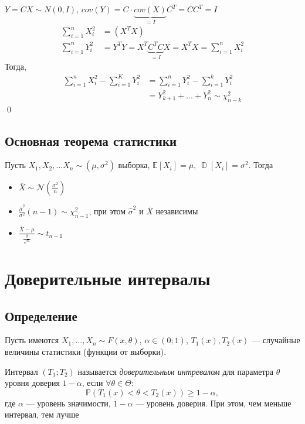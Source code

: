 \documentclass[a4paper, 10pt]{article}
\begin{document}
\proof $Y=C X \sim N(0, I)$, $cov(Y)=C\cdot \underbrace{cov(X)}_{=I}C^T=CC^T=I$
\begin{equation*}
    \begin{aligned}
        \sum_{i=1}^{n} X_{i}^{2}&=\left(X^{T} X\right)\\
        \sum_{i=1}^{n} Y_{i}^{2}&=Y^TY=X^T\underbrace{C^TC}_{=I}X=X^TX=\sum_{i=1}^{n} X_{i}^{2}
    \end{aligned}
\end{equation*}
Тогда,
\begin{equation*}
    \begin{aligned}
        \sum_{i=1}^{n} X_{i}^{2}-\sum_{i=1}^{K} Y_{i}^{2}&=\sum_{i=1}^{n} Y_{i}^{2}-\sum_{i=1}^{k} Y_{i}^{2}\\
        &=Y^2_{k+1}+\ldots+Y^2_{n}\sim\chi^2_{n-k}
    \end{aligned}
\end{equation*}\qed

\subsection{Основная теорема статистики}
\theorem Пусть $X_{1}, X_{2}, \ldots X_{n} \sim\left(\mu, \sigma^{2}\right)$ выборка, $\mathbb{E}\left[X_{i}\right]=\mu,\ \operatorname{\mathbb{D}}\left[X_{i}\right]=\sigma^{2}$. Тогда
\begin{itemize}
    \item $\overline{X}\sim \mathcal{N}\left(\frac{\sigma^{2}}{n}\right)$
    \item $\displaystyle\frac{\widehat{\sigma}^2}{\sigma^2}(n-1)\sim\chi^2_{n-1}$, при этом $\widehat{\sigma}^2$ и $\overline{X}$ независимы
    \item $\frac{\bar{X}-\mu}{\frac{\hat{\sigma}}{\sqrt{n}}} \sim t_{n-1}$ 
\end{itemize}


\newpage
\section{Доверительные интервалы}
\subsection{Определение}
Пусть имеются $X_1,\ldots,X_n\sim F(x, \theta)$, $\alpha\in(0;1)$, $T_1(x), T_2(x)$ — случайные величины статистики (функции от выборки).

 Интервал $(T_1;T_2)$ называется \textit{доверительным интревалом} для параметра $\theta$ уровня доверия $1-\alpha$, если $\forall\theta\in\Theta$:
\begin{equation*}
    \mathbb{P}\left(T_1(x)<\theta<T_2(x)\right)\geqslant1-\alpha,
\end{equation*}
где $\alpha$ — уровень значимости, $1-\alpha$ — уровень доверия. При этом, чем меньше интервал, тем лучше
\end{document}
